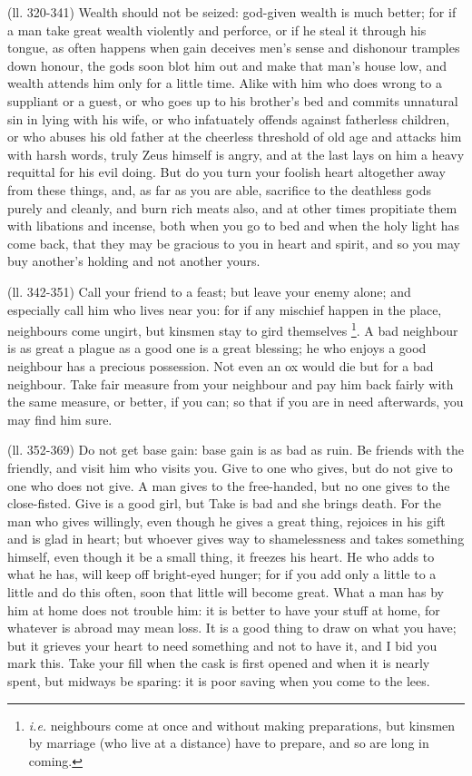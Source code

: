 (ll. 320-341) Wealth should not be seized: god-given wealth is much better; for
if a man take great wealth violently and perforce, or if he steal it through
his tongue, as often happens when gain deceives men’s sense and dishonour
tramples down honour, the gods soon blot him out and make that man’s
house low, and wealth attends him only for a little time. Alike with him who
does wrong to a suppliant or a guest, or who goes up to his brother’s bed
and commits unnatural sin in lying with his wife, or who infatuately offends
against fatherless children, or who abuses his old father at the cheerless
threshold of old age and attacks him with harsh words, truly Zeus himself is
angry, and at the last lays on him a heavy requittal for his evil doing. But do
you turn your foolish heart altogether away from these things, and, as far as
you are able, sacrifice to the deathless gods purely and cleanly, and burn rich
meats also, and at other times propitiate them with libations and incense, both
when you go to bed and when the holy light has come back, that they may be
gracious to you in heart and spirit, and so you may buy another’s holding
and not another yours.

(ll. 342-351) Call your friend to a feast; but leave your enemy alone; and
especially call him who lives near you: for if any mischief happen in the
place, neighbours come ungirt, but kinsmen stay to gird themselves \footnote{\emph{i.e.} neighbours
come at once and without making preparations, but kinsmen by marriage (who live
at a distance) have to prepare, and so are long in coming.}. A bad neighbour is as great a
plague as a good one is a great blessing; he who enjoys a good neighbour has a
precious possession. Not even an ox would die but for a bad neighbour. Take
fair measure from your neighbour and pay him back fairly with the same measure,
or better, if you can; so that if you are in need afterwards, you may find him
sure.

(ll. 352-369) Do not get base gain: base gain is as bad as ruin. Be friends
with the friendly, and visit him who visits you. Give to one who gives, but do
not give to one who does not give. A man gives to the free-handed, but no one
gives to the close-fisted. Give is a good girl, but Take is bad and she brings
death. For the man who gives willingly, even though he gives a great thing,
rejoices in his gift and is glad in heart; but whoever gives way to
shamelessness and takes something himself, even though it be a small thing, it
freezes his heart. He who adds to what he has, will keep off bright-eyed
hunger; for if you add only a little to a little and do this often, soon that
little will become great. What a man has by him at home does not trouble him:
it is better to have your stuff at home, for whatever is abroad may mean loss.
It is a good thing to draw on what you have; but it grieves your heart to need
something and not to have it, and I bid you mark this. Take your fill when the
cask is first opened and when it is nearly spent, but midways be sparing: it is
poor saving when you come to the lees.

